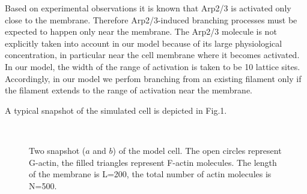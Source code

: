 \documentclass[aps,preprint,pre,array,epsfig,eqsecnum]{revtex4}
\begin{document}
Based on experimental observations it is known that Arp2/3 
is activated only close to the membrane. Therefore Arp2/3-induced
branching processes must be expected to happen only near the membrane.
%
The Arp2/3 molecule is not explicitly taken into account in our model
because of its large physiological concentration, in particular near the
cell membrane where it becomes activated. In our model, the width of the range 
of activation is taken to be 10 lattice sites. 
%
Accordingly, in our model 
we perfom branching from an existing filament
only if the filament extends to the range of activation near the membrane. 

A typical snapshot of the simulated cell 
is depicted in Fig.1. 


\begin{figure}
\begin{center}
 \\
 \label{fig:snapshot}
 \caption{
 Two snapshot ($a$ and $b$) of the model cell. The open circles represent
    G-actin, the filled triangles represent F-actin molecules.     
    The length
    of the membrane is L=200, the total number of actin molecules is N=500.
   }
  \end{center}
  \end{figure}
\end{document}

